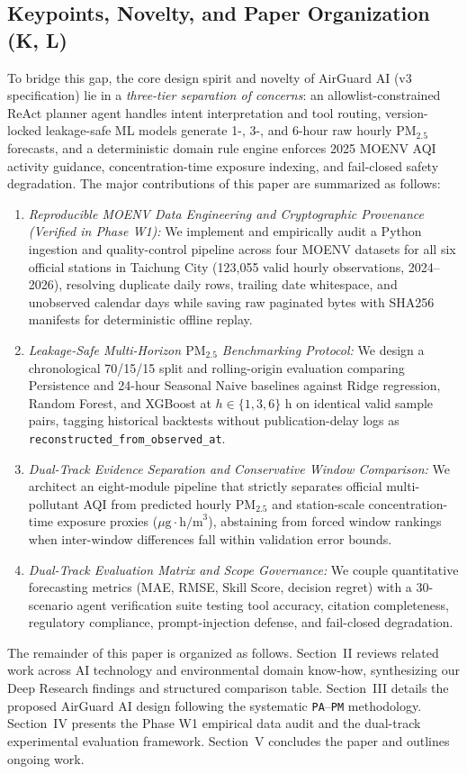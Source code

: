 \subsection{Keypoints, Novelty, and Paper Organization (K, L)}
To bridge this gap, the core design spirit and novelty of AirGuard AI (v3 specification) lie in a \emph{three-tier separation of concerns}: an allowlist-constrained ReAct planner agent handles intent interpretation and tool routing, version-locked leakage-safe ML models generate 1-, 3-, and 6-hour raw hourly $\text{PM}_{2.5}$ forecasts, and a deterministic domain rule engine enforces 2025 MOENV AQI activity guidance, concentration-time exposure indexing, and fail-closed safety degradation. The major contributions of this paper are summarized as follows:
\begin{enumerate}
    \item \emph{Reproducible MOENV Data Engineering and Cryptographic Provenance (Verified in Phase W1):} We implement and empirically audit a Python ingestion and quality-control pipeline across four MOENV datasets for all six official stations in Taichung City (123,055 valid hourly observations, 2024--2026), resolving duplicate daily rows, trailing date whitespace, and unobserved calendar days while saving raw paginated bytes with SHA256 manifests for deterministic offline replay.
    \item \emph{Leakage-Safe Multi-Horizon $\text{PM}_{2.5}$ Benchmarking Protocol:} We design a chronological 70/15/15 split and rolling-origin evaluation comparing Persistence and 24-hour Seasonal Naive baselines against Ridge regression, Random Forest, and XGBoost at $h \in \{1, 3, 6\}\text{ h}$ on identical valid sample pairs, tagging historical backtests without publication-delay logs as \texttt{reconstructed\_from\_observed\_at}.
    \item \emph{Dual-Track Evidence Separation and Conservative Window Comparison:} We architect an eight-module pipeline that strictly separates official multi-pollutant AQI from predicted hourly $\text{PM}_{2.5}$ and station-scale concentration-time exposure proxies ($\mu\text{g}\cdot\text{h/m}^3$), abstaining from forced window rankings when inter-window differences fall within validation error bounds.
    \item \emph{Dual-Track Evaluation Matrix and Scope Governance:} We couple quantitative forecasting metrics (MAE, RMSE, Skill Score, decision regret) with a 30-scenario agent verification suite testing tool accuracy, citation completeness, regulatory compliance, prompt-injection defense, and fail-closed degradation.
\end{enumerate}

The remainder of this paper is organized as follows. Section~II reviews related work across AI technology and environmental domain know-how, synthesizing our Deep Research findings and structured comparison table. Section~III details the proposed AirGuard AI design following the systematic \texttt{PA}--\texttt{PM} methodology. Section~IV presents the Phase W1 empirical data audit and the dual-track experimental evaluation framework. Section~V concludes the paper and outlines ongoing work.
